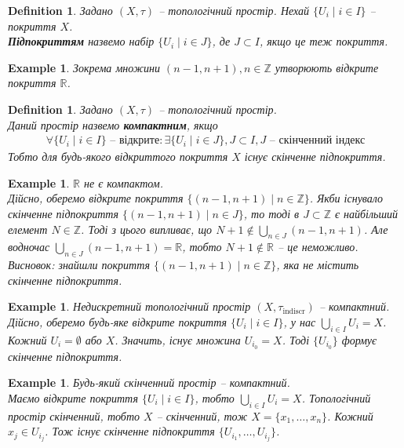 \documentclass[a4paper, 10pt]{article}
\theoremstyle{theoremdd}
\newtheorem{definition}[theorem]{Definition}
\newtheorem{example}[theorem]{Example}
\begin{document}
\begin{definition}
Задано $(X,\tau)$ -- топологічний простір. Нехай $\{U_i \mid i \in I\}$ -- покриття $X$.\\
\textbf{Підпокриттям} назвемо набір $\{U_i \mid i \in J\}$, де $J \subset I$, якщо це теж покриття.
\end{definition}

\begin{example}
Зокрема множини $(n-1,n+1), n \in \mathbb{Z}$ утворюють відкрите покриття $\mathbb{R}$.
\end{example}

\begin{definition}
Задано $(X,\tau)$ -- топологічний простір.\\
Даний простір назвемо \textbf{компактним}, якщо
\begin{align*}
\forall \{ U_i \mid i \in I \} \text{ -- відкрите}: \exists \{U_i \mid i \in J\}, J \subset I, J \text{ -- скінченний індекс}
\end{align*}
Тобто для будь-якого відкриттого покриття $X$ існує скінченне підпокриття.
\end{definition}

\begin{example}
$\mathbb{R}$ не є компактом.\\
Дійсно, оберемо відкрите покриття $\{(n-1,n+1) \mid n \in \mathbb{Z}\}$. Якби існувало скінченне підпокриття $\{(n-1,n+1) \mid n \in J\}$, то тоді в $J \subset \mathbb{Z}$ є найбільший елемент $N \in \mathbb{Z}$. Тоді з цього випливає, що $N+1 \notin \displaystyle\bigcup_{n \in J} (n-1,n+1)$. Але водночас $\displaystyle\bigcup_{n \in J} (n-1,n+1) = \mathbb{R}$, тобто $N+1 \notin \mathbb{R}$ -- це неможливо.\\
Висновок: знайшли покриття $\{(n-1,n+1) \mid n \in \mathbb{Z}\}$, яка не містить скінченне підпокриття.
\end{example}

\begin{example}
Недискретний топологічний простір $(X,\tau_{\text{indiscr}})$ -- компактний.\\
Дійсно, оберемо будь-яке відкрите покриття $\{U_i \mid i \in I\}$, у нас $\displaystyle\bigcup_{i \in I} U_i = X$. Кожний $U_i = \emptyset$ або $X$. Значить, існує множина $U_{i_0} = X$. Тоді $\{U_{i_0}\}$ формує скінченне підпокриття.
\end{example}

\begin{example}
\label{finite_is_compact}
Будь-який скінченний простір -- компактний.\\
Маємо відкрите покриття $\{U_i \mid i \in I\}$, тобто $\displaystyle\bigcup_{i \in I} U_i = X$. Топологічний простір скінченний, тобто $X$ -- скінченний, тож $X = \{x_1,\dots,x_n\}$. Кожний $x_j \in U_{i_j}$. Тож існує скінченне підпокриття $\{U_{i_1},\dots,U_{i_j}\}$.
\end{example}
\end{document}
